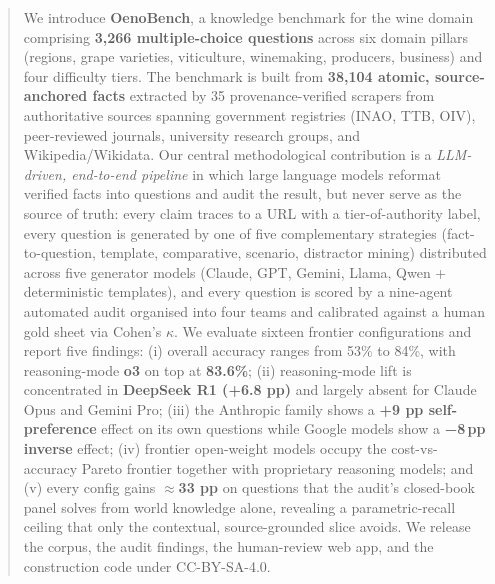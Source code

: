 \begin{abstract}
We introduce \textbf{OenoBench}, a knowledge benchmark for the wine domain
comprising \textbf{3{,}266 multiple-choice questions} across six domain
pillars (regions, grape varieties, viticulture, winemaking, producers,
business) and four difficulty tiers. The benchmark is built from
\textbf{38{,}104 atomic, source-anchored facts} extracted by 35
provenance-verified scrapers from authoritative sources spanning
government registries (INAO, TTB, OIV), peer-reviewed journals, university
research groups, and Wikipedia/Wikidata. Our central methodological
contribution is a \emph{LLM-driven, end-to-end pipeline} in which large
language models reformat verified facts into questions and audit the
result, but never serve as the source of truth: every claim traces to a
URL with a tier-of-authority label, every question is generated by one of
five complementary strategies (fact-to-question, template, comparative,
scenario, distractor mining) distributed across five generator models
(Claude, GPT, Gemini, Llama, Qwen + deterministic templates), and every
question is scored by a nine-agent automated audit organised into four
teams and calibrated against a human gold sheet via Cohen's $\kappa$. We
evaluate sixteen frontier configurations and report five findings: (i)
overall accuracy ranges from 53\% to 84\%, with reasoning-mode \textbf{o3}
on top at \textbf{83.6\%}; (ii) reasoning-mode lift is concentrated in
\textbf{DeepSeek R1 (+6.8 pp)} and largely absent for Claude Opus and
Gemini Pro; (iii) the Anthropic family shows a \textbf{+9 pp
self-preference} effect on its own questions while Google models show a
\textbf{−8\,pp inverse} effect; (iv) frontier open-weight models occupy
the cost-vs-accuracy Pareto frontier together with proprietary reasoning
models; and (v) every config gains \textbf{$\approx$33 pp} on questions
that the audit's closed-book panel solves from world knowledge alone,
revealing a parametric-recall ceiling that only the contextual,
source-grounded slice avoids. We release the corpus, the audit findings,
the human-review web app, and the construction code under CC-BY-SA-4.0.
\end{abstract}
